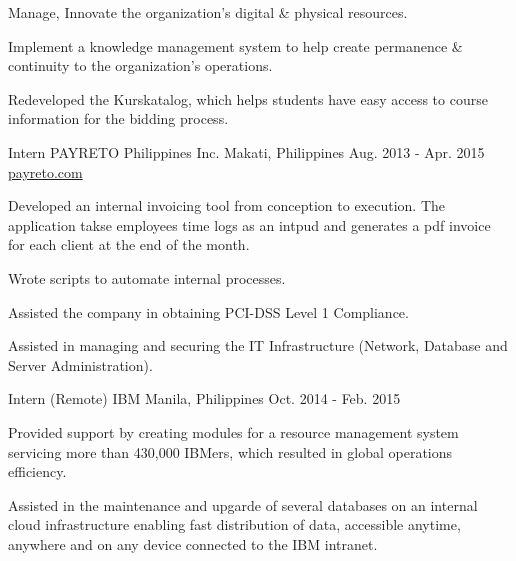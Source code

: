 \begin{cventries}
{\begin{cvitems}
        \item {Manage, Innovate the organization's digital \& physical resources.}
        \item {Implement a knowledge management system to help create permanence \& continuity to the organization's operations.}
        \item {Redeveloped the Kurskatalog, which helps students have easy access to course information for the bidding process.}
      \end{cvitems}
    }
  \cventry
    {Intern} %
    {PAYRETO Philippines Inc.} %
    {Makati, Philippines} %
    {Aug. 2013 - Apr. 2015} %
    {\href{https://payreto.com}{payreto.com}} %
    {
      \begin{cvitems} %
        \item {Developed an internal invoicing tool from conception to execution. The application takse employees time logs as an intpud and generates a pdf invoice for each client at the end of the month.}
        \item {Wrote scripts to automate internal processes.}
        \item {Assisted the company in obtaining PCI-DSS Level 1 Compliance.}
        \item { Assisted in managing and securing the IT Infrastructure (Network, Database and Server Administration).}
        \end{cvitems}
    }
  \cventry
    {Intern (Remote)} %
    {IBM} %
    {Manila, Philippines} %
    {Oct. 2014 - Feb. 2015} %
    {} %
    {
      \begin{cvitems} %
        \item {Provided support by creating modules for a resource management system servicing more than 430,000 IBMers, which resulted in global operations efficiency.}
        \item {Assisted in the maintenance and upgarde of several databases on an internal cloud infrastructure enabling fast distribution of data, accessible anytime, anywhere and on any device connected to the IBM intranet.}
      \end{cvitems}
    }

\end{cventries}
